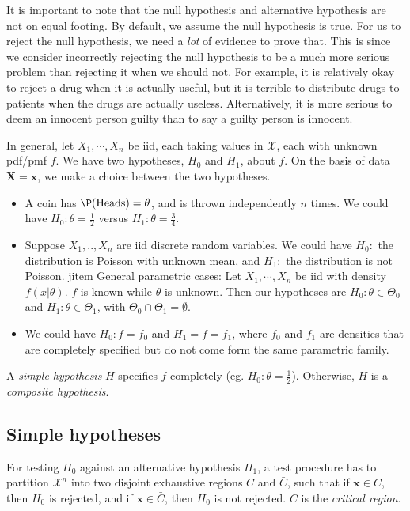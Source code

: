 \documentclass[a4paper]{article}
\begin{document}
It is important to note that the null hypothesis and alternative hypothesis are not on equal footing. By default, we assume the null hypothesis is true. For us to reject the null hypothesis, we need a \emph{lot} of evidence to prove that. This is since we consider incorrectly rejecting the null hypothesis to be a much more serious problem than rejecting it when we should not. For example, it is relatively okay to reject a drug when it is actually useful, but it is terrible to distribute drugs to patients when the drugs are actually useless. Alternatively, it is more serious to deem an innocent person guilty than to say a guilty person is innocent.

In general, let $X_1, \cdots, X_n$ be iid, each taking values in $\mathcal{X}$, each with unknown pdf/pmf $f$. We have two hypotheses, $H_0$ and $H_1$, about $f$. On the basis of data $\mathbf{X} = \mathbf{x}$, we make a choice between the two hypotheses.

\begin{eg}\leavevmode
  \begin{itemize}
    \item A coin has $\P(\text{Heads}) = \theta$, and is thrown independently $n$ times. We could have $H_0:\theta = \frac{1}{2}$ versus $H_1: \theta = \frac{3}{4}.$
    \item Suppose $X_1, .., X_n$ are iid discrete random variables. We could have $H_0:$ the distribution is Poisson with unknown mean, and $H_1:$ the distribution is not Poisson.
    jitem General parametric cases: Let $X_1, \cdots , X_n$ be iid with density $f(x|\theta)$. $f$ is known while $\theta$ is unknown. Then our hypotheses are $H_0: \theta\in \Theta_0$ and $H_1:\theta\in \Theta_1$, with $\Theta_0\cap \Theta_1 = \emptyset$.
    \item We could have $H_0: f = f_0$ and $H_1 = f = f_1$, where $f_0$ and $f_1$ are densities that are completely specified but do not come form the same parametric family.
  \end{itemize}
\end{eg}

\begin{defi}
  A \emph{simple hypothesis} $H$ specifies $f$ completely (eg. $H_0: \theta = \frac{1}{2}$). Otherwise, $H$ is a \emph{composite hypothesis}.
\end{defi}

\subsection{Simple hypotheses}
\begin{defi}
  For testing $H_0$ against an alternative hypothesis $H_1$, a test procedure has to partition $\mathcal{X}^n$ into two disjoint exhaustive regions $C$ and $\bar C$, such that if $\mathbf{x}\in C$, then $H_0$ is rejected, and if $\mathbf{x}\in \bar C$, then $H_0$ is not rejected. $C$ is the \emph{critical region}.
\end{defi}
\end{document}
